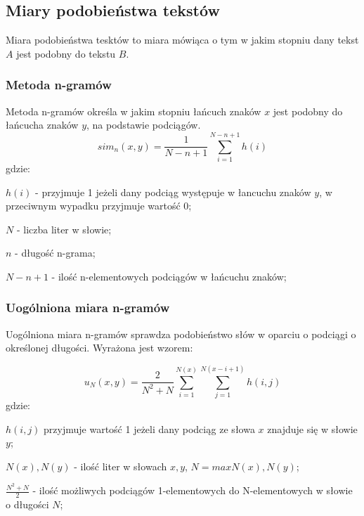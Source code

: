 \documentclass{classrep}
\begin{document}
\subsection{Miary podobieństwa tekstów}
Miara podobieństwa tesktów to miara mówiąca o tym w jakim stopniu dany tekst $A$ jest podobny do tekstu $B$.

\subsubsection{Metoda n-gramów}
Metoda n-gramów określa w jakim stopniu łańcuch znaków $x$ jest podobny do łańcucha znaków $y$, na podstawie podciągów.
\begin{equation}
    sim_{n}(x,y)=\frac{1}{N-n+1}\sum_{i=1}^{N-n+1}h(i)
\end{equation}
gdzie:\\
\begin{description}
    \item $h(i)$ - przyjmuje 1 jeżeli dany podciąg występuje w łancuchu znaków $y$, w przeciwnym wypadku przyjmuje wartość 0;
    \item $N$ - liczba liter w słowie;
    \item $n$ - długość n-grama;
    \item $N-n+1$ - ilość n-elementowych podciągów w łańcuchu znaków;
\end{description}

\subsubsection{Uogólniona miara n-gramów}
Uogólniona miara n-gramów sprawdza podobieństwo słów w oparciu o podciągi o określonej długości. Wyrażona jest wzorem:

\begin{equation}
    u_{N}(x, y)=\frac{2}{N^{2}+N}\sum_{i=1}^{N(x)}\sum_{j=1}^{N(x-i+1)}h(i,j)
\end{equation}
gdzie:\\
\begin{description}
    \item $h(i,j)$ przyjmuje wartość 1 jeżeli dany podciąg ze słowa $x$ znajduje się w słowie $y$;
    \item $N(x),N(y)$ - ilość liter w słowach $x, y$, $N=max{N(x),N(y)}$;
    \item $\frac{N^{2}+N}{2}$ - ilość możliwych podciągów 1-elementowych do N-elementowych w słowie o długości $N$;
\end{description}
\end{document}
